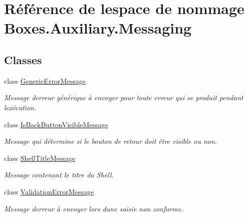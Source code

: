 \hypertarget{namespace_boxes_1_1_auxiliary_1_1_messaging}{}\section{Référence de l\textquotesingle{}espace de nommage Boxes.\+Auxiliary.\+Messaging}
\label{namespace_boxes_1_1_auxiliary_1_1_messaging}
\subsection*{Classes}
\begin{DoxyCompactItemize}
\item 
class \hyperlink{class_boxes_1_1_auxiliary_1_1_messaging_1_1_generic_error_message}{Generic\+Error\+Message}
\begin{DoxyCompactList}\small\item\em Message d\textquotesingle{}erreur générique à envoyer pour toute erreur qui se produit pendant l\textquotesingle{}exécution. \end{DoxyCompactList}\item 
class \hyperlink{class_boxes_1_1_auxiliary_1_1_messaging_1_1_is_back_button_visible_message}{Is\+Back\+Button\+Visible\+Message}
\begin{DoxyCompactList}\small\item\em Message qui détermine si le bouton de retour doit être visible ou non. \end{DoxyCompactList}\item 
class \hyperlink{class_boxes_1_1_auxiliary_1_1_messaging_1_1_shell_title_message}{Shell\+Title\+Message}
\begin{DoxyCompactList}\small\item\em Message contenant le titre du Shell. \end{DoxyCompactList}\item 
class \hyperlink{class_boxes_1_1_auxiliary_1_1_messaging_1_1_validation_error_message}{Validation\+Error\+Message}
\begin{DoxyCompactList}\small\item\em Message d\textquotesingle{}erreur à envoyer lors d\textquotesingle{}une saisie non conforme. \end{DoxyCompactList}\end{DoxyCompactItemize}

